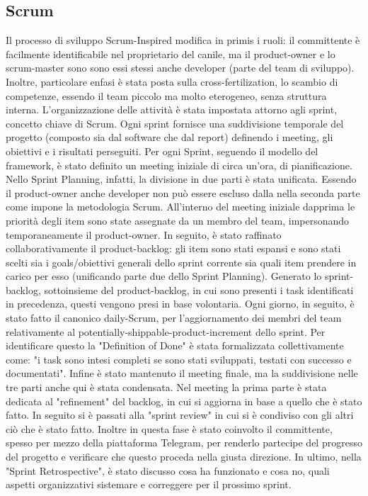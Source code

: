     \subsection{Scrum}
    Il processo di sviluppo Scrum-Inspired modifica in primis i ruoli: il committente è facilmente identificabile nel proprietario del canile, ma il product-owner e lo scrum-master sono sono essi stessi anche developer (parte del team di sviluppo). 
    Inoltre, particolare enfasi è stata posta sulla cross-fertilization, lo scambio di competenze, essendo il team piccolo ma molto eterogeneo, senza struttura interna.
    L'organizzazione delle attività è stata impostata attorno agli sprint, concetto chiave di Scrum. Ogni sprint fornisce una suddivisione temporale del progetto (composto sia dal software che dal report) definendo i meeting, gli obiettivi e i risultati perseguiti. Per ogni Sprint, seguendo il modello del framework, è stato definito un meeting iniziale di circa un'ora, di pianificazione. 
    Nello Sprint Planning, infatti, la divisione in due parti è stata unificata. Essendo il product-owner anche developer non può essere escluso dalla nella seconda parte come impone la metodologia Scrum. 
    All'interno del meeting iniziale dapprima le priorità degli item sono state assegnate da un membro del team, impersonando temporaneamente il product-owner. In seguito, è stato raffinato collaborativamente il product-backlog: gli item sono stati espansi e sono stati scelti sia i goals/obiettivi generali dello sprint corrente sia quali item prendere in carico per esso (unificando parte due dello Sprint Planning).
    Generato lo sprint-backlog, sottoinsieme del product-backlog, in cui sono presenti i task identificati in precedenza, questi vengono presi in base volontaria. 
    Ogni giorno, in seguito, è stato fatto il canonico daily-Scrum, per l'aggiornamento dei membri del team relativamente al potentially-shippable-product-increment dello sprint.
    Per identificare questo la "Definition of Done" è stata formalizzata collettivamente come: "i task sono intesi completi se sono stati sviluppati, testati con successo e documentati".
    Infine è stato mantenuto il meeting finale, ma la suddivisione nelle tre parti anche qui è stata condensata. 
    Nel meeting la prima parte è stata dedicata al "refinement" del backlog, in cui si aggiorna in base a quello che è stato fatto. In seguito si è passati alla "sprint review" in cui si è condiviso con gli altri ciò che è stato fatto. Inoltre in questa fase è stato coinvolto il committente, spesso per mezzo della piattaforma Telegram, per renderlo partecipe del progresso del progetto e verificare che questo proceda nella giusta direzione. In ultimo, nella "Sprint Retrospective", è stato discusso cosa ha funzionato e cosa no, quali aspetti organizzativi sistemare e correggere per il prossimo sprint. 
    
